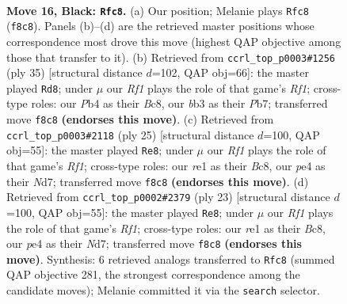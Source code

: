 \documentclass[11pt]{article}
\begin{document}
\clearpage

\begin{figure}[p]\centering
\begin{subfigure}{0.46\textwidth}\centering
\resizebox{\linewidth}{!}{%
\newchessgame
\chessboard[
  setfen={r4rk1/1Np1bppp/p2p1nn1/7b/1pP1PP2/1B6/PP4P1/RNB1R1K1 b - - 1 16},
  showmover=false,
  pgfstyle=straightmove, color=movearrow, markmove={f8-c8}
]}
\caption{}
\end{subfigure}\hfill
\begin{subfigure}{0.46\textwidth}\centering
\resizebox{\linewidth}{!}{%
\newchessgame
\chessboard[
  setfen={r1b2rk1/pp1npp1p/3p1np1/3P4/P1NPPP2/8/2BN2PP/R3R1K1 b - - 0 18},
  showmover=false,
  pgfstyle=straightmove, color=movearrow, markmove={f8-d8}
]}
\caption{}
\end{subfigure}
\\[4pt]
\begin{subfigure}{0.46\textwidth}\centering
\resizebox{\linewidth}{!}{%
\newchessgame
\chessboard[
  setfen={r1b2rk1/3n1ppp/p3pn2/Npb5/8/4P3/PP2BPPP/RNBR2K1 b - - 1 13},
  showmover=false,
  pgfstyle=straightmove, color=movearrow, markmove={f8-e8}
]}
\caption{}
\end{subfigure}\hfill
\begin{subfigure}{0.46\textwidth}\centering
\resizebox{\linewidth}{!}{%
\newchessgame
\chessboard[
  setfen={r1b2rk1/3n1ppp/p3pn2/Npb5/8/4P3/PP2BPPP/RNBR2K1 b - - 1 12},
  showmover=false,
  pgfstyle=straightmove, color=movearrow, markmove={f8-e8}
]}
\caption{}
\end{subfigure}
\caption{\textbf{Move 16, Black: \texttt{Rfc8}.} (a) Our position; Melanie plays \texttt{Rfc8} (\texttt{f8c8}). Panels (b)--(d) are the retrieved master positions whose correspondence most drove this move (highest QAP objective among those that transfer to it). (b) Retrieved from \texttt{ccrl\_top\_p0003\#1256} (ply 35) [structural distance $d$=102, QAP obj=66]: the master played \texttt{Rd8}; under $\mu$ our \emph{Rf1} plays the role of that game's \emph{Rf1}; cross-type roles: our \emph{P}b4 as their \emph{B}c8, our \emph{b}b3 as their \emph{P}b7; transferred move \texttt{f8c8} \textbf{(endorses this move)}. (c) Retrieved from \texttt{ccrl\_top\_p0003\#2118} (ply 25) [structural distance $d$=100, QAP obj=55]: the master played \texttt{Re8}; under $\mu$ our \emph{Rf1} plays the role of that game's \emph{Rf1}; cross-type roles: our \emph{r}e1 as their \emph{B}c8, our \emph{p}e4 as their \emph{N}d7; transferred move \texttt{f8c8} \textbf{(endorses this move)}. (d) Retrieved from \texttt{ccrl\_top\_p0002\#2379} (ply 23) [structural distance $d$=100, QAP obj=55]: the master played \texttt{Re8}; under $\mu$ our \emph{Rf1} plays the role of that game's \emph{Rf1}; cross-type roles: our \emph{r}e1 as their \emph{B}c8, our \emph{p}e4 as their \emph{N}d7; transferred move \texttt{f8c8} \textbf{(endorses this move)}. Synthesis: 6 retrieved analogs transferred to \texttt{Rfc8} (summed QAP objective 281, the strongest correspondence among the candidate moves); Melanie committed it via the \texttt{search} selector.}
\label{fig:thought-m31}
\end{figure}
\end{document}
